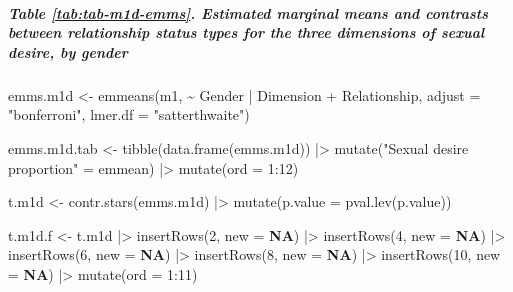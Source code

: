 \documentclass[
  bookmarksnumbered]{article}
\newenvironment{Shaded}{\begin{snugshade}}{\end{snugshade}}
\newcommand{\AttributeTok}[1]{\textcolor[rgb]{0.80,0.80,0.80}{#1}}
\newcommand{\ConstantTok}[1]{\textcolor[rgb]{0.86,0.64,0.64}{\textbf{#1}}}
\newcommand{\DecValTok}[1]{\textcolor[rgb]{0.86,0.86,0.80}{#1}}
\newcommand{\FunctionTok}[1]{\textcolor[rgb]{0.94,0.94,0.56}{#1}}
\newcommand{\NormalTok}[1]{\textcolor[rgb]{0.80,0.80,0.80}{#1}}
\newcommand{\OtherTok}[1]{\textcolor[rgb]{0.94,0.94,0.56}{#1}}
\newcommand{\SpecialCharTok}[1]{\textcolor[rgb]{0.86,0.64,0.64}{#1}}
\newcommand{\StringTok}[1]{\textcolor[rgb]{0.80,0.58,0.58}{#1}}
\begin{document}
\hypertarget{table-reftabtab-m1d-emms.-estimated-marginal-means-and-contrasts-between-relationship-status-types-for-the-three-dimensions-of-sexual-desire-by-gender}{%
\subparagraph{Table \ref{tab:tab-m1d-emms}. Estimated marginal means and contrasts between relationship status types for the three dimensions of sexual desire, by gender}\label{table-reftabtab-m1d-emms.-estimated-marginal-means-and-contrasts-between-relationship-status-types-for-the-three-dimensions-of-sexual-desire-by-gender}}

\begin{Shaded}
\begin{Highlighting}[]
\NormalTok{emms.m1d }\OtherTok{\textless{}{-}} \FunctionTok{emmeans}\NormalTok{(m1, }\SpecialCharTok{\textasciitilde{}}\NormalTok{ Gender }\SpecialCharTok{|}\NormalTok{ Dimension }\SpecialCharTok{+}\NormalTok{ Relationship,}
                    \AttributeTok{adjust =} \StringTok{"bonferroni"}\NormalTok{,}
                    \AttributeTok{lmer.df =} \StringTok{"satterthwaite"}\NormalTok{)}

\NormalTok{emms.m1d.tab }\OtherTok{\textless{}{-}} \FunctionTok{tibble}\NormalTok{(}\FunctionTok{data.frame}\NormalTok{(emms.m1d)) }\SpecialCharTok{|\textgreater{}}
  \FunctionTok{mutate}\NormalTok{(}\StringTok{"Sexual desire proportion"} \OtherTok{=}\NormalTok{ emmean) }\SpecialCharTok{|\textgreater{}} 
  \FunctionTok{mutate}\NormalTok{(}\AttributeTok{ord =} \DecValTok{1}\SpecialCharTok{:}\DecValTok{12}\NormalTok{)}

\NormalTok{t.m1d }\OtherTok{\textless{}{-}} \FunctionTok{contr.stars}\NormalTok{(emms.m1d) }\SpecialCharTok{|\textgreater{}} 
  \FunctionTok{mutate}\NormalTok{(}\AttributeTok{p.value =} \FunctionTok{pval.lev}\NormalTok{(p.value))}

\NormalTok{t.m1d.f }\OtherTok{\textless{}{-}}\NormalTok{ t.m1d }\SpecialCharTok{|\textgreater{}} 
  \FunctionTok{insertRows}\NormalTok{(}\DecValTok{2}\NormalTok{, }\AttributeTok{new =} \ConstantTok{NA}\NormalTok{) }\SpecialCharTok{|\textgreater{}}
  \FunctionTok{insertRows}\NormalTok{(}\DecValTok{4}\NormalTok{, }\AttributeTok{new =} \ConstantTok{NA}\NormalTok{) }\SpecialCharTok{|\textgreater{}} 
  \FunctionTok{insertRows}\NormalTok{(}\DecValTok{6}\NormalTok{, }\AttributeTok{new =} \ConstantTok{NA}\NormalTok{) }\SpecialCharTok{|\textgreater{}} 
  \FunctionTok{insertRows}\NormalTok{(}\DecValTok{8}\NormalTok{, }\AttributeTok{new =} \ConstantTok{NA}\NormalTok{) }\SpecialCharTok{|\textgreater{}} 
  \FunctionTok{insertRows}\NormalTok{(}\DecValTok{10}\NormalTok{, }\AttributeTok{new =} \ConstantTok{NA}\NormalTok{) }\SpecialCharTok{|\textgreater{}} 
  \FunctionTok{mutate}\NormalTok{(}\AttributeTok{ord =} \DecValTok{1}\SpecialCharTok{:}\DecValTok{11}\NormalTok{)}


\end{Highlighting}
\end{Shaded}
\end{document}
